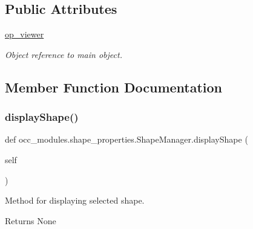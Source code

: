 \subsection*{Public Attributes}
\begin{DoxyCompactItemize}
\item 
\hypertarget{a00095_ad60197d66a3c059f30f32c2ab1a12841}{}\label{a00095_ad60197d66a3c059f30f32c2ab1a12841} 
\hyperlink{a00095_ad60197d66a3c059f30f32c2ab1a12841}{op\+\_\+viewer}
\begin{DoxyCompactList}\small\item\em Object reference to main object. \end{DoxyCompactList}\end{DoxyCompactItemize}


\subsection{Member Function Documentation}
\hypertarget{a00095_aba26c11e7e7ec6c2c6709a27cbeaaf69}{}\label{a00095_aba26c11e7e7ec6c2c6709a27cbeaaf69} 
\subsubsection{\texorpdfstring{display\+Shape()}{displayShape()}}
{\footnotesize\ttfamily def occ\+\_\+modules.\+shape\+\_\+properties.\+Shape\+Manager.\+display\+Shape (\begin{DoxyParamCaption}\item[{}]{self }\end{DoxyParamCaption})}



Method for displaying selected shape. 

\begin{DoxyReturn}{Returns}
None 
\end{DoxyReturn}
\hypertarget{a00095_ad4293087adb512ea61fe0c3429c0e08c}{}\label{a00095_ad4293087adb512ea61fe0c3429c0e08c} 
